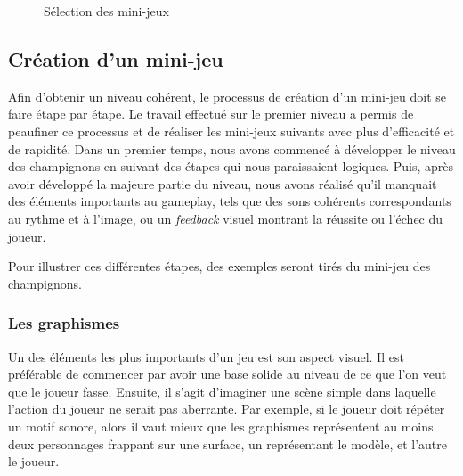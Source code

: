 \begin{figure}[H]\centering
  \caption{Sélection des mini-jeux}
  \label{SelectionMiniJeu}
\end{figure}

\subsection{Création d'un mini-jeu}

Afin d'obtenir un niveau cohérent, le processus de création d'un mini-jeu doit se faire étape par étape. Le travail effectué sur le premier niveau a permis de peaufiner ce processus et de réaliser les mini-jeux suivants avec plus d'efficacité et de rapidité. Dans un premier temps, nous avons commencé à développer le niveau des champignons en suivant des étapes qui nous paraissaient logiques. Puis, après avoir développé la majeure partie du niveau, nous avons réalisé qu'il manquait des éléments importants au gameplay, tels que des sons cohérents correspondants au rythme et à l'image, ou un \textit{feedback} visuel montrant la réussite ou l'échec du joueur.

Pour illustrer ces différentes étapes, des exemples seront tirés du mini-jeu des champignons.

\subsubsection{Les graphismes}

Un des éléments les plus importants d'un jeu est son aspect visuel. Il est préférable de commencer par avoir une base solide au niveau de ce que l'on veut que le joueur fasse. Ensuite, il s'agit d'imaginer une scène simple dans laquelle l'action du joueur ne serait pas aberrante. Par exemple, si le joueur doit répéter un motif sonore, alors il vaut mieux que les graphismes représentent au moins deux personnages frappant sur une surface, un représentant le modèle, et l'autre le joueur.

